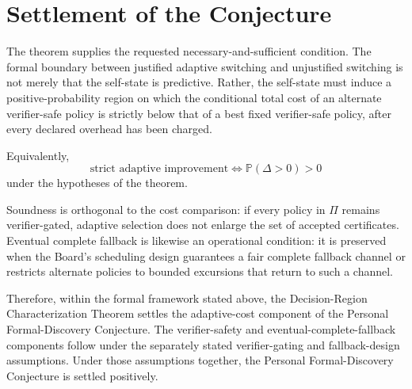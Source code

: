\documentclass[11pt]{article}
\begin{document}
\section{Settlement of the Conjecture}

The theorem supplies the requested necessary-and-sufficient condition. The formal boundary between justified adaptive switching and unjustified switching is not merely that the self-state is predictive. Rather, the self-state must induce a positive-probability region on which the conditional total cost of an alternate verifier-safe policy is strictly below that of a best fixed verifier-safe policy, after every declared overhead has been charged.

Equivalently,
\[
  \boxed{
  \text{strict adaptive improvement}
  \iff
  \mathbb{P}(\Delta>0)>0
  }
\]
under the hypotheses of the theorem.

Soundness is orthogonal to the cost comparison: if every policy in $\Pi$ remains verifier-gated, adaptive selection does not enlarge the set of accepted certificates. Eventual complete fallback is likewise an operational condition: it is preserved when the Board's scheduling design guarantees a fair complete fallback channel or restricts alternate policies to bounded excursions that return to such a channel.

Therefore, within the formal framework stated above, the Decision-Region Characterization Theorem settles the adaptive-cost component of the Personal Formal-Discovery Conjecture. The verifier-safety and eventual-complete-fallback components follow under the separately stated verifier-gating and fallback-design assumptions. Under those assumptions together, the Personal Formal-Discovery Conjecture is settled positively.
\end{document}
